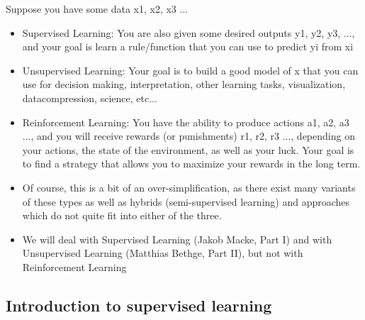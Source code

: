 Suppose you have some data x1, x2, x3 ...
\begin{itemize}
\item Supervised Learning: You are also given some desired outputs y1, y2, y3, ..., and
your goal is learn a rule/function that you can use to predict yi from xi
\item Unsupervised Learning: Your goal is to build a good model of x that you can use
for decision making, interpretation, other learning tasks, visualization, datacompression,
science, etc...
\item Reinforcement Learning: You have the ability to produce actions a1, a2, a3 ..., and
you will receive rewards (or punishments) r1, r2, r3 ..., depending on your actions, the
state of the environment, as well as your luck. Your goal is to find a strategy that
allows you to maximize your rewards in the long term.
\item Of course, this is a bit of an over-simplification, as there exist many variants of these
types as well as hybrids (semi-supervised learning) and approaches which do not
quite fit into either of the three.
\item We will deal with Supervised Learning (Jakob Macke, Part I) and with Unsupervised
Learning (Matthias Bethge, Part II), but not with Reinforcement Learning
\end{itemize}



\subsection{Introduction to supervised learning}

